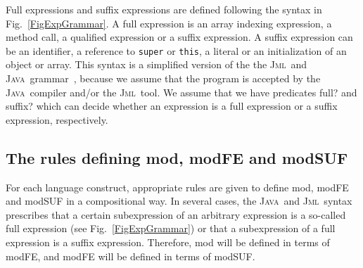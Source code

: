 \documentclass[a4paper]{llncs}
\newcommand{\jml}{\textsc{Jml}}
\newcommand{\java}{\textsc{Java}}
\begin{document}
Full expressions and suffix expressions are defined following the
syntax in Fig.~\ref{FigExpGrammar}. A full expression is an array
indexing expression, a method call, a qualified expression or a suffix
expression. A suffix expression can be an identifier, a reference to
\texttt{super} or \texttt{this}, a literal or an initialization of an 
object or array.  This syntax is a simplified version of the the
\jml\ and \java\ grammar~\cite{LeavensBR00,GoslingJSB00}, because we 
assume that the program is accepted by the \java\ compiler and/or the
\jml\ tool.%
We assume that we have predicates \textsf{full?} and
\textsf{suffix?} which can decide whether an expression is a full
expression or a suffix expression, respectively.



%




\subsection{The rules defining \textsf{mod}, \textsf{modFE} and \textsf{modSUF}}
For each language construct, appropriate rules are given to define
\textsf{mod}, \textsf{modFE} and \textsf{modSUF} in a compositional
way.  In several cases, the
\java\ and \jml\ syntax prescribes that a certain subexpression of an 
arbitrary expression is a so-called full expression (see
Fig.~\ref{FigExpGrammar}) or that a subexpression of a full expression
is a suffix expression. Therefore, \textsf{mod} will be defined in
terms of \textsf{modFE}, and \textsf{modFE} will be defined in terms
of \textsf{modSUF}.
\end{document}
